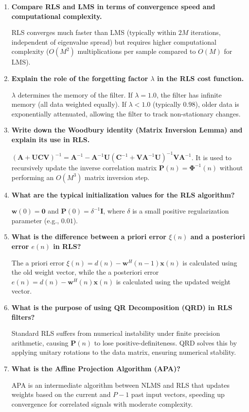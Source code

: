 \documentclass[12pt,a4paper]{article}
\newcommand{\Q}[1]{\textbf{#1}\par\noindent\ignorespaces}
\begin{document}
\begin{tcolorbox}[exambox, title={\textbf{Frequently Asked / Viva Questions}}]
\begin{enumerate}[topsep=0pt, label=\textbf{Q\arabic*.}, itemsep=5pt]
  \item \Q{Compare RLS and LMS in terms of convergence speed and computational complexity.}
    RLS converges much faster than LMS (typically within $2M$ iterations, independent of eigenvalue spread) but requires higher computational complexity ($O(M^2)$ multiplications per sample compared to $O(M)$ for LMS).
  \item \Q{Explain the role of the forgetting factor $\lambda$ in the RLS cost function.}
    $\lambda$ determines the memory of the filter. If $\lambda = 1.0$, the filter has infinite memory (all data weighted equally). If $\lambda < 1.0$ (typically $0.98$), older data is exponentially attenuated, allowing the filter to track non-stationary changes.
  \item \Q{Write down the Woodbury identity (Matrix Inversion Lemma) and explain its use in RLS.}
    $(\mathbf{A} + \mathbf{U}\mathbf{C}\mathbf{V})^{-1} = \mathbf{A}^{-1} - \mathbf{A}^{-1}\mathbf{U}(\mathbf{C}^{-1} + \mathbf{V}\mathbf{A}^{-1}\mathbf{U})^{-1}\mathbf{V}\mathbf{A}^{-1}$. It is used to recursively update the inverse correlation matrix $\mathbf{P}(n) = \mathbf{\Phi}^{-1}(n)$ without performing an $O(M^3)$ matrix inversion step.
  \item \Q{What are the typical initialization values for the RLS algorithm?}
    $\mathbf{w}(0) = \mathbf{0}$ and $\mathbf{P}(0) = \delta^{-1}\mathbf{I}$, where $\delta$ is a small positive regularization parameter (e.g., $0.01$).
  \item \Q{What is the difference between a priori error $\xi(n)$ and a posteriori error $e(n)$ in RLS?}
    The a priori error $\xi(n) = d(n) - \mathbf{w}^H(n-1)\mathbf{x}(n)$ is calculated using the old weight vector, while the a posteriori error $e(n) = d(n) - \mathbf{w}^H(n)\mathbf{x}(n)$ is calculated using the updated weight vector.
  \item \Q{What is the purpose of using QR Decomposition (QRD) in RLS filters?}
    Standard RLS suffers from numerical instability under finite precision arithmetic, causing $\mathbf{P}(n)$ to lose positive-definiteness. QRD solves this by applying unitary rotations to the data matrix, ensuring numerical stability.
  \item \Q{What is the Affine Projection Algorithm (APA)?}
    APA is an intermediate algorithm between NLMS and RLS that updates weights based on the current and $P-1$ past input vectors, speeding up convergence for correlated signals with moderate complexity.

\end{enumerate}
\end{tcolorbox}
\end{document}
